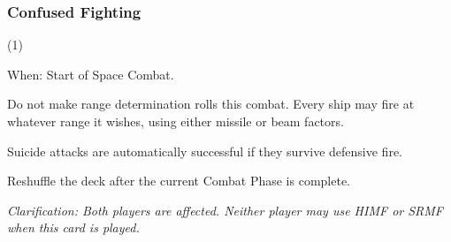 \subsubsection{Confused Fighting} (1)

When: Start of Space Combat.

Do not make range determination rolls this combat. Every ship may fire at whatever range it wishes, using either missile or beam factors.

Suicide attacks are automatically successful if they survive defensive fire.

Reshuffle the deck after the current Combat Phase is complete.

\textit{Clarification: Both players are affected. Neither player may use HIMF or SRMF when this card is played.}